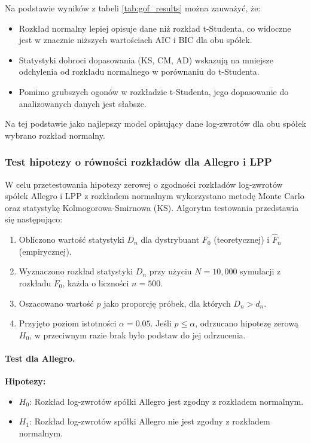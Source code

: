 \documentclass[12pt]{article}
\begin{document}
Na podstawie wyników z tabeli \ref{tab:gof_results} można zauważyć, że:
\begin{itemize}
    \item Rozkład normalny lepiej opisuje dane niż rozkład t-Studenta, co widoczne jest w znacznie niższych wartościach AIC i BIC dla obu spółek.
    \item Statystyki dobroci dopasowania (KS, CM, AD) wskazują na mniejsze odchylenia od rozkładu normalnego w porównaniu do t-Studenta.
    \item Pomimo grubszych ogonów w rozkładzie t-Studenta, jego dopasowanie do analizowanych danych jest słabsze.
\end{itemize}

Na tej podstawie jako najlepszy model opisujący dane log-zwrotów dla obu spółek wybrano rozkład normalny.

\subsubsection{Test hipotezy o równości rozkładów dla Allegro i LPP}

W celu przetestowania hipotezy zerowej o zgodności rozkładów log-zwrotów spółek Allegro i LPP z rozkładem normalnym wykorzystano metodę Monte Carlo oraz statystykę Kolmogorowa-Smirnowa (KS). Algorytm testowania przedstawia się następująco:

\begin{enumerate}
    \item Obliczono wartość statystyki \( D_n \) dla dystrybuant \( F_0 \) (teoretycznej) i \( \hat{F}_n \) (empirycznej).
    \item Wyznaczono rozkład statystyki \( D_n \) przy użyciu \( N = 10,000 \) symulacji z rozkładu \( F_0 \), każda o liczności \( n = 500 \).
    \item Oszacowano wartość \( p \) jako proporcję próbek, dla których \( D_n > d_n \).
    \item Przyjęto poziom istotności \( \alpha = 0.05 \). Jeśli \( p \leq \alpha \), odrzucano hipotezę zerową \( H_0 \), w przeciwnym razie brak było podstaw do jej odrzucenia.
\end{enumerate}

\paragraph{Test dla Allegro.}  
\textbf{Hipotezy:}
\begin{itemize}
    \item \( H_0 \): Rozkład log-zwrotów spółki Allegro jest zgodny z rozkładem normalnym.
    \item \( H_1 \): Rozkład log-zwrotów spółki Allegro nie jest zgodny z rozkładem normalnym.
\end{itemize}
\end{document}
